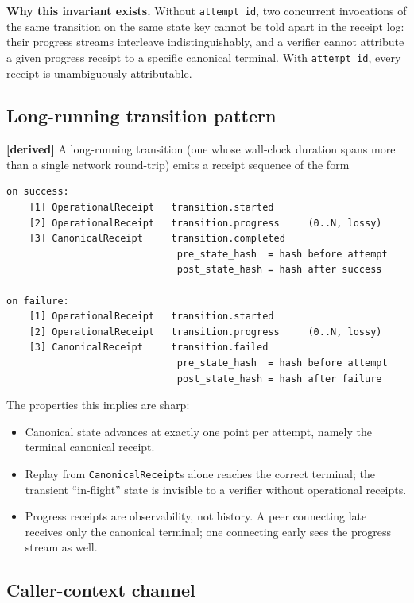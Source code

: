 \documentclass[11pt,a4paper]{article}
\newcommand{\derived}{\textcolor{derivedcolor}{\textbf{[derived]}}\xspace}
\theoremstyle{definition}
\begin{document}
\textbf{Why this invariant exists.} Without \texttt{attempt\_id},
two concurrent invocations of the same transition on the same
state key cannot be told apart in the receipt log: their progress
streams interleave indistinguishably, and a verifier cannot
attribute a given progress receipt to a specific canonical
terminal. With \texttt{attempt\_id}, every receipt is unambiguously
attributable.

\subsection{Long-running transition pattern}
\label{sec:long-running}

\derived{} A long-running transition (one whose wall-clock duration
spans more than a single network round-trip) emits a receipt
sequence of the form

\begin{lstlisting}
on success:
    [1] OperationalReceipt   transition.started
    [2] OperationalReceipt   transition.progress     (0..N, lossy)
    [3] CanonicalReceipt     transition.completed
                              pre_state_hash  = hash before attempt
                              post_state_hash = hash after success

on failure:
    [1] OperationalReceipt   transition.started
    [2] OperationalReceipt   transition.progress     (0..N, lossy)
    [3] CanonicalReceipt     transition.failed
                              pre_state_hash  = hash before attempt
                              post_state_hash = hash after failure
\end{lstlisting}

The properties this implies are sharp:
\begin{itemize}[leftmargin=2em,itemsep=0.3em]
    \item Canonical state advances at exactly one point per attempt,
    namely the terminal canonical receipt.
    \item Replay from \texttt{CanonicalReceipt}s alone reaches the
    correct terminal; the transient ``in-flight'' state is invisible
    to a verifier without operational receipts.
    \item Progress receipts are observability, not history. A peer
    connecting late receives only the canonical terminal; one
    connecting early sees the progress stream as well.
\end{itemize}

\subsection{Caller-context channel}
\label{sec:caller-context}
\end{document}
